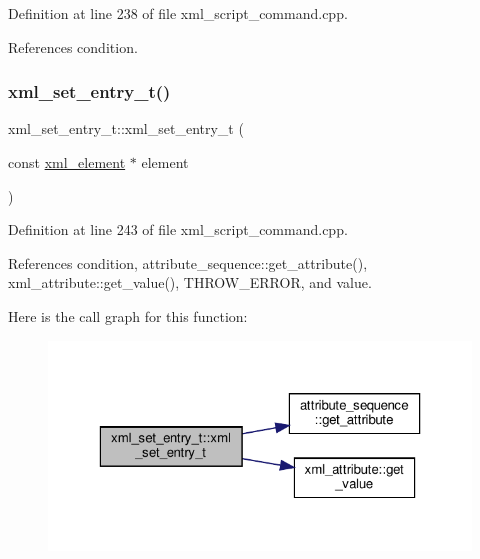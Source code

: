 Definition at line 238 of file xml\+\_\+script\+\_\+command.\+cpp.



References condition.

\mbox{\label{classxml__set__entry__t_a7e28ace09855210ec6e9d0f91815beb6}} 
\subsubsection{\texorpdfstring{xml\+\_\+set\+\_\+entry\+\_\+t()}{xml\_set\_entry\_t()}\hspace{0.1cm}{\footnotesize\ttfamily [2/2]}}
{\footnotesize\ttfamily xml\+\_\+set\+\_\+entry\+\_\+t\+::xml\+\_\+set\+\_\+entry\+\_\+t (\begin{DoxyParamCaption}\item[{const \hyperlink{classxml__element}{xml\+\_\+element} $\ast$}]{element }\end{DoxyParamCaption})\hspace{0.3cm}{\ttfamily [explicit]}}



Definition at line 243 of file xml\+\_\+script\+\_\+command.\+cpp.



References condition, attribute\+\_\+sequence\+::get\+\_\+attribute(), xml\+\_\+attribute\+::get\+\_\+value(), T\+H\+R\+O\+W\+\_\+\+E\+R\+R\+OR, and value.

Here is the call graph for this function\+:
\nopagebreak
\begin{figure}[H]
\begin{center}
\leavevmode
\includegraphics[width=323pt]{d1/d5b/classxml__set__entry__t_a7e28ace09855210ec6e9d0f91815beb6_cgraph}
\end{center}
\end{figure}
\mbox{\label{classxml__set__entry__t_aea02ff0324bf8b342184969c935bf54f}} 
